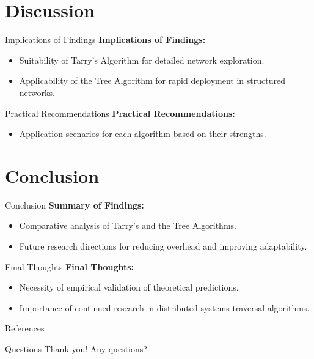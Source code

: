 \documentclass[11pt]{beamer}
\begin{document}
\section{Discussion}
\begin{frame}{Implications of Findings}
    \textbf{Implications of Findings:}
    \begin{itemize}
        \item Suitability of Tarry's Algorithm for detailed network exploration.
        \item Applicability of the Tree Algorithm for rapid deployment in structured networks.
    \end{itemize}
\end{frame}

\begin{frame}{Practical Recommendations}
    \textbf{Practical Recommendations:}
    \begin{itemize}
        \item Application scenarios for each algorithm based on their strengths.
    \end{itemize}
\end{frame}

\section{Conclusion}
\begin{frame}{Conclusion}
    \textbf{Summary of Findings:}
    \begin{itemize}
        \item Comparative analysis of Tarry's and the Tree Algorithms.
        \item Future research directions for reducing overhead and improving adaptability.
    \end{itemize}
\end{frame}

\begin{frame}{Final Thoughts}
    \textbf{Final Thoughts:}
    \begin{itemize}
        \item Necessity of empirical validation of theoretical predictions.
        \item Importance of continued research in distributed systems traversal algorithms.
    \end{itemize}
\end{frame}

\begin{frame}{References}
\end{frame}

\begin{frame}{Questions}
    \centering \Large
    Thank you! Any questions?
\end{frame}
\end{document}

